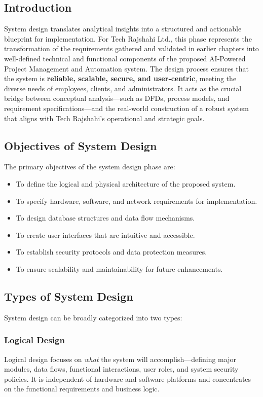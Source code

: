\documentclass[12pt,a4paper]{article}
\newcommand{\company}[1]{#1}
\begin{document}
\subsection{Introduction}
System design translates analytical insights into a structured and actionable blueprint for implementation.  For \company{Tech Rajshahi Ltd.}, this phase represents the transformation of the requirements gathered and validated in earlier chapters into well‑defined technical and functional components of the proposed AI‑Powered Project Management and Automation system.  The design process ensures that the system is \textbf{reliable, scalable, secure, and user‑centric}, meeting the diverse needs of employees, clients, and administrators.  It acts as the crucial bridge between conceptual analysis—such as DFDs, process models, and requirement specifications—and the real‑world construction of a robust system that aligns with Tech Rajshahi's operational and strategic goals.

\subsection{Objectives of System Design}
The primary objectives of the system design phase are:
\begin{itemize}
    \item To define the logical and physical architecture of the proposed system.
    \item To specify hardware, software, and network requirements for implementation.
    \item To design database structures and data flow mechanisms.
    \item To create user interfaces that are intuitive and accessible.
    \item To establish security protocols and data protection measures.
    \item To ensure scalability and maintainability for future enhancements.
\end{itemize}

\subsection{Types of System Design}
System design can be broadly categorized into two types:

\subsubsection{Logical Design}
Logical design focuses on \textit{what} the system will accomplish—defining major modules, data flows, functional interactions, user roles, and system security policies.  It is independent of hardware and software platforms and concentrates on the functional requirements and business logic.
\end{document}
